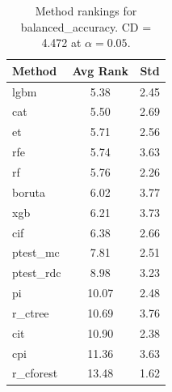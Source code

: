 \begin{table}[h]
\centering
\caption{Method rankings for balanced_accuracy. CD = 4.472 at $\alpha=0.05$.}
\label{tab:ranks_balanced_accuracy}
\begin{tabular}{lcc}
\toprule
Method & Avg Rank & Std \\
\midrule
lgbm & 5.38 & 2.45 \\
cat & 5.50 & 2.69 \\
et & 5.71 & 2.56 \\
rfe & 5.74 & 3.63 \\
rf & 5.76 & 2.26 \\
boruta & 6.02 & 3.77 \\
xgb & 6.21 & 3.73 \\
cif & 6.38 & 2.66 \\
ptest_mc & 7.81 & 2.51 \\
ptest_rdc & 8.98 & 3.23 \\
pi & 10.07 & 2.48 \\
r_ctree & 10.69 & 3.76 \\
cit & 10.90 & 2.38 \\
cpi & 11.36 & 3.63 \\
r_cforest & 13.48 & 1.62 \\
\bottomrule
\end{tabular}
\end{table}